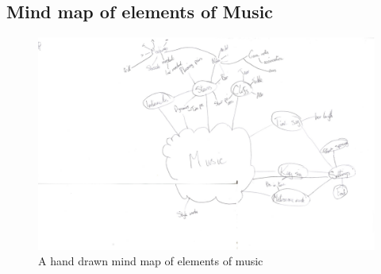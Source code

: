 \begin{appendices}
\section{Mind map of elements of Music}
\begin{figure}[h]
\centering
\includegraphics[width=500pt]{mindmap}
\caption{A hand drawn mind map of elements of music}	
\label{fig:mindmap}
\end{figure}


\end{appendices}
